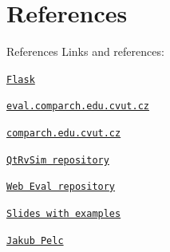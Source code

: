 \documentclass{beamer}
\begin{document}
		\begin{frame}[fragile]
			\tiny
			\inputminted{toml}{examples/5/complex.toml}
		\end{frame}

	\section{References}

	\begin{frame}{References}
		Links and references: \par
		{\centering \texttt{\href{https://flask.palletsprojects.com/en/3.0.x/}{Flask}} \par}
		{\centering \texttt{\href{http://eval.comparch.edu.cvut.cz}{eval.comparch.edu.cvut.cz}} \par}
		{\centering \texttt{\href{http://comparch.edu.cvut.cz}{comparch.edu.cvut.cz}} \par}
		{\centering \texttt{\href{https://github.com/cvut/qtrvsim}{QtRvSim repository}} \par}
		{\centering \texttt{\href{https://gitlab.fel.cvut.cz/b35apo/qtrvsim-eval-web}{Web Eval repository}} \par}
		{\centering \texttt{\href{https://github.com/kubakubakuba/if24-flask-web-eval}{Slides with examples}} \par}
		{\centering \texttt{\href{https://swpelc.eu}{Jakub Pelc}} \par}
	\end{frame}
\end{document}
